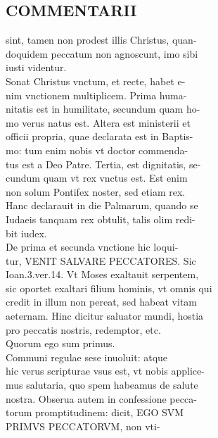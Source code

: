 \documentclass{article}
\begin{document}
\begin{pages}
\section*{COMMENTARII \\
                }
sint, tamen non prodest illis Christus, quan- \\
                doquidem peccatum non agnoscunt, imo sibi \\
                iusti videntur. \\
                Sonat Christus vnctum, et recte, habet e- \\
                nim vnctionem multiplicem. Prima huma- \\
                nitatis est in humilitate, secundum quam ho- \\
                mo verus natus est. Altera est ministerii et \\
                officii propria, quae declarata est in Baptis- \\
                mo: tum enim nobis vt doctor commenda- \\
                tus est a Deo Patre. Tertia, est dignitatis, se- \\
                cundum quam vt rex vnctus est. Est enim \\
                non solum Pontifex noster, sed etiam rex. \\
                Hanc declarauit in die Palmarum, quando se \\
                Iudaeis tanquam rex obtulit, talis olim redi- \\
                bit iudex. \\
                De prima et secunda vnctione hic loqui- \\
                tur, VENIT SALVARE PECCATORES. Sic \\
                Ioan.3.ver.14. Vt Moses exaltauit serpentem, \\
                sic oportet exaltari filium hominis, vt omnis qui \\
                credit in illum non pereat, sed habeat vitam \\
                aeternam. Hinc dicitur saluator mundi, hostia \\
                pro peccatis nostris, redemptor, etc. \\
                Quorum ego sum primus. \\
                Communi regulae sese inuoluit: atque \\
                hic verus scripturae vsus est, vt nobis applice- \\
                mus salutaria, quo spem habeamus de salute \\
                nostra. Obserua autem in confessione pecca- \\
                torum promptitudinem: dicit, EGO SVM \\
                PRIMVS PECCATORVM, non vti- \\
                

\end{pages}
\end{document}
